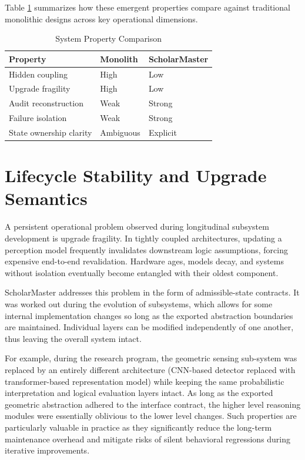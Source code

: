 \documentclass[conference]{IEEEtran}
\begin{document}
Table \ref{tab:comparison} summarizes how these emergent properties compare against traditional monolithic designs across key operational dimensions.

\begin{table}[htbp]
\caption{System Property Comparison}
\label{tab:comparison}
\centering
\begin{tabular}{@{}lll@{}}
\toprule
\textbf{Property} & \textbf{Monolith} & \textbf{ScholarMaster} \\
\midrule
Hidden coupling & High & Low \\
Upgrade fragility & High & Low \\
Audit reconstruction & Weak & Strong \\
Failure isolation & Weak & Strong \\
State ownership clarity & Ambiguous & Explicit \\
\bottomrule
\end{tabular}
\end{table}

\section{Lifecycle Stability and Upgrade Semantics}
A persistent operational problem observed during longitudinal subsystem development is upgrade fragility. In tightly coupled architectures, updating a perception model frequently invalidates downstream logic assumptions, forcing expensive end-to-end revalidation. Hardware ages, models decay, and systems without isolation eventually become entangled with their oldest component.

ScholarMaster addresses this problem in the form of admissible-state contracts. It was worked out during the evolution of subsystems, which allows for some internal implementation changes so long as the exported abstraction boundaries are maintained. Individual layers can be modified independently of one another, thus leaving the overall system intact.

For example, during the research program, the geometric sensing sub-system was replaced by an entirely different architecture (CNN-based detector replaced with transformer-based representation model) while keeping the same probabilistic interpretation and logical evaluation layers intact. As long as the exported geometric abstraction adhered to the interface contract, the higher level reasoning modules were essentially oblivious to the lower level changes. Such properties are particularly valuable in practice as they significantly reduce the long-term maintenance overhead and mitigate risks of silent behavioral regressions during iterative improvements.
\end{document}
